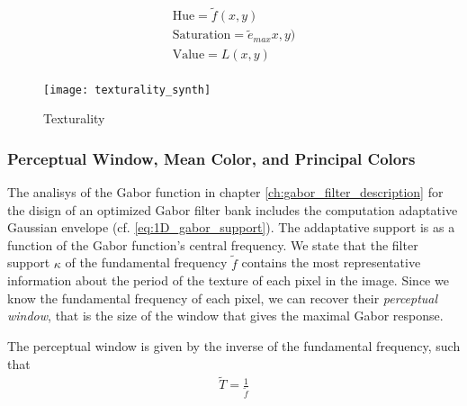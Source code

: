\begin{gather}
    \text{Hue} = \widetilde{f}(x,y) \\
    \text{Saturation} = \widetilde{e}_{max}x,y) \\
    \text{Value} = L(x,y) \\
\end{gather}

\begin{figure}[!ht]
	\texttt{[image: texturality\_synth]}
    \caption{Texturality}
    \label{fig:texturality_synth}
\end{figure}

%                  

\subsubsection{Perceptual Window, Mean Color, and Principal Colors}
The analisys of the Gabor function in chapter \ref{ch:gabor_filter_description} for the disign of an optimized Gabor filter bank includes the computation adaptative Gaussian envelope (cf. \eqref{eq:1D_gabor_support}). The addaptative support is as a function of the Gabor function's central frequency. We state that the filter support $\kappa$ of the fundamental frequency $\widetilde{f}$ contains the most representative information about the period of the texture of each pixel in the image. Since we know the fundamental frequency of each pixel, we can recover their \textit{perceptual window}, that is the size of the window that gives the maximal Gabor response.

The perceptual window is given by the inverse of the fundamental frequency, such that
\begin{gather}
    \widetilde{T} = \frac{1}{\widetilde{f}} \label{eq:perceptual_window}
\end{gather}

